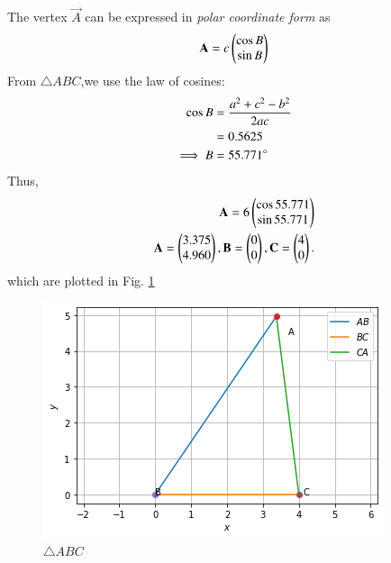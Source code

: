
The vertex  $\vec{A}$ can  be expressed  in {\em polar coordinate form} as
\begin{align}
\mathbf{A} = c\begin{pmatrix}\cos B \\  \sin B\end{pmatrix} 
\end{align}
From $\triangle ABC$,we use the law of cosines: 
\begin{align}
\cos B &= \frac{a^2+c^2-b^2}{2ac}
\\
&= 0.5625
\\
\implies {B} &= 55.771 \degree
\end{align}
Thus, 
\begin{align}
\mathbf{A} = 6\begin{pmatrix}\cos 55.771 \\ \sin 55.771 \end{pmatrix}
\\
\mathbf{A} = \begin{pmatrix}3.375\\4.960\end{pmatrix}, 
\mathbf{B} = \begin{pmatrix}0\\0\end{pmatrix}, \mathbf{C} = \begin{pmatrix}4\\0\end{pmatrix}.
\end{align}
which are plotted in Fig. \ref{tri/1/fig:tri_sss_triangle}	
\begin{figure}[!ht]
\centering
\includegraphics[width=\columnwidth]{solutions/triangle/1/download.png}
\caption{ $\triangle ABC$}
\label{tri/1/fig:tri_sss_triangle}	
\end{figure}
